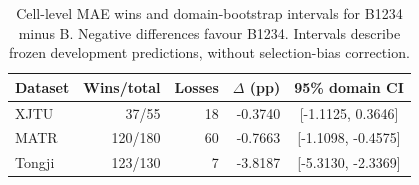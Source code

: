 \begin{table}[!htbp]
\centering
\caption{Cell-level MAE wins and domain-bootstrap intervals for B1234 minus B. Negative differences favour B1234. Intervals describe frozen development predictions, without selection-bias correction.}
\label{tab:celluncertainty}
\footnotesize
\setlength{\tabcolsep}{4pt}
\begin{tabular}{lrrrc}
\toprule
Dataset & Wins/total & Losses & $\Delta$ (pp) & 95\% domain CI \\
\midrule
XJTU & 37/55 & 18 & -0.3740 & [-1.1125, 0.3646] \\
MATR & 120/180 & 60 & -0.7663 & [-1.1098, -0.4575] \\
Tongji & 123/130 & 7 & -3.8187 & [-5.3130, -2.3369] \\
\bottomrule
\end{tabular}
\end{table}
